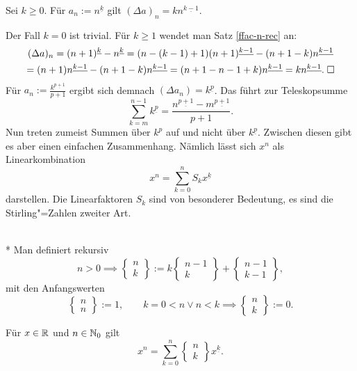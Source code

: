 \begin{Satz}\label{diff-ffac}
Sei $k\ge 0$. Für $a_n:=n^{\underline k}$ gilt
$(\Delta a)_n = kn^{\underline{k-1}}$.
\end{Satz}
 Der Fall $k=0$ ist trivial. Für $k\ge 1$
wendet man Satz \ref{ffac-n-rec} an:
\begin{gather*}
(\Delta a)_n = (n+1)^{\underline k}-n^{\underline k}
= (n-(k-1)+1)(n+1)^{\underline {k-1}}-(n+1-k)n^{\underline{k-1}}\\
= (n+1)n^{\underline{k-1}}-(n+1-k)n^{\underline{k-1}}
= (n+1-n-1+k)n^{\underline{k-1}} = kn^{\underline{k-1}}.\;\Box
\end{gather*}
Für $a_n:=\tfrac{k^{\underline {p+1}}}{p+1}$ ergibt sich
demnach $(\Delta a_n) = k^{\underline p}$. Das führt zur
Teleskopsumme
\[\sum_{k=m}^{n-1} k^{\underline p}
= \frac{n^{\underline{p+1}}-m^{\underline{p+1}}}{p+1}.\]
Nun treten zumeist Summen über $k^p$ auf und nicht
über $k^{\underline p}$. Zwischen diesen gibt es aber einen
einfachen Zusammenhang. Nämlich lässt sich $x^n$ als
Linearkombination
\[x^n = \sum_{k=0}^n S_k x^{\underline k}\]
darstellen. Die Linearfaktoren $S_k$ sind von besonderer
Bedeutung, es sind die Stirling"=Zahlen zweiter Art.
\begin{Definition}\mbox{}\\*
Man definiert rekursiv
\[n>0\implies\begin{Bmatrix}n\\ k\end{Bmatrix} :=
k\begin{Bmatrix}n-1\\ k\end{Bmatrix}
+\begin{Bmatrix}n-1\\ k-1\end{Bmatrix},\]
mit den Anfangswerten
\[\begin{Bmatrix}n\\ n\end{Bmatrix} := 1,\qquad
k=0<n\lor n<k\implies\begin{Bmatrix}n\\ k\end{Bmatrix} := 0.\]
\end{Definition}
\begin{Satz}\label{power-stirling}
Für $x\in\mathbb R$ und $n\in\mathbb N_0$ gilt
\[x^n = \sum_{k=0}^n \begin{Bmatrix}n\\ k\end{Bmatrix} x^{\underline k}.\]
\end{Satz}
